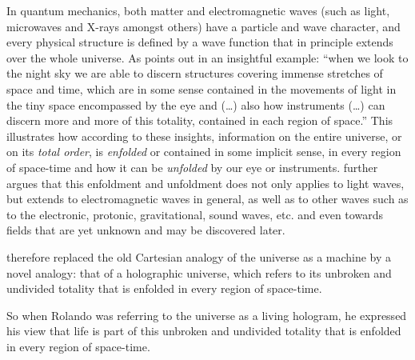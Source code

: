 \documentclass[
  11pt,
]{book}
\begin{document}
In quantum mechanics, both matter and electromagnetic waves (such as light, microwaves and X-rays amongst others) have a particle and wave character, and every physical structure is defined by a wave function that in principle extends over the whole universe. As \citet{bohm1980} points out in an insightful example: ``when we look to the night sky we are able to discern structures covering immense stretches of space and time, which are in some sense contained in the movements of light in the tiny space encompassed by the eye and (\ldots) also how instruments (\ldots) can discern more and more of this totality, contained in each region of space.'' This illustrates how according to these insights, information on the entire universe, or on its \emph{total order}, is \emph{enfolded} or contained in some implicit sense, in every region of space-time and how it can be \emph{unfolded} by our eye or instruments. \citet{bohm1980} further argues that this enfoldment and unfoldment does not only applies to light waves, but extends to electromagnetic waves in general, as well as to other waves such as to the electronic, protonic, gravitational, sound waves, etc. and even towards fields that are yet unknown and may be discovered later.

\citet{bohm1980} therefore replaced the old Cartesian analogy of the universe as a machine by a novel analogy: that of a holographic universe, which refers to its unbroken and undivided totality that is enfolded in every region of space-time.

So when Rolando was referring to the universe as a living hologram, he expressed his view that life is part of this unbroken and undivided totality that is enfolded in every region of space-time.
\end{document}
